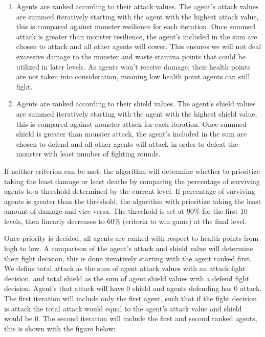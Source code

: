 \begin{enumerate}
    \item  Agents are ranked according to their attack values. The agent's attack values are summed iteratively starting with the agent with the highest attack value, this is compared against monster resilience for each iteration. Once summed attack is greater than monster resilience, the agent's included in the sum are chosen to attack and all other agents will cower. This ensures we will not deal excessive damage to the monster and waste stamina points that could be utilized in later levels. As agents won't receive damage, their health points are not taken into consideration, meaning low health point agents can still fight.
    \item  Agents are ranked according to their shield values. The agent's shield values are summed iteratively starting with the agent with the highest shield value, this is compared against monster attack for each iteration. Once summed shield is greater than monster attack, the agent's included in the sum are chosen to defend and all other agents will attack in order to defeat the monster with least number of fighting rounds.
\end{enumerate}

If neither criterion can be met, the algorithm will determine whether to prioritize taking the least damage or least deaths by comparing the percentage of surviving agents to a threshold determined by the current level. If percentage of surviving agents is greater than the threshold, the algorithm with prioritize taking the least amount of damage and vice versa. The threshold is set at 90\% for the first 10 levels, then linearly decreases to 60\% (criteria to win game) at the final level.

Once priority is decided, all agents are ranked with respect to health points from high to low. A comparison of the agent's attack and shield value will determine their fight decision, this is done iteratively starting with the agent ranked first. We define total attack as the sum of agent attack values with an attack fight decision, and total shield as the sum of agent shield values with a defend fight decision. Agent's that attack will have 0 shield and agents defending has 0 attack. The first iteration will include only the first agent, such that if the fight decision is attack the total attack would equal to the agent's attack value and shield would be 0. The second iteration will include the first and second ranked agents, this is shown with the figure below:

